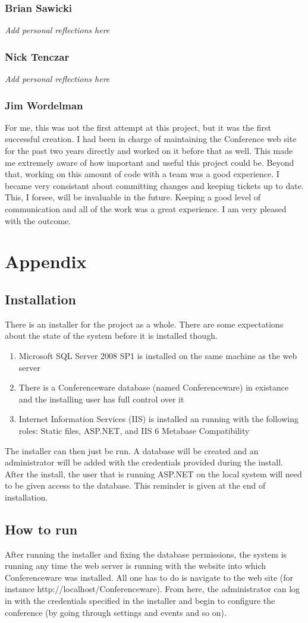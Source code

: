 \documentclass[12pt]{article}
\begin{document}
\subsubsection{Brian Sawicki}
\textit{Add personal reflections here}
\subsubsection{Nick Tenczar}
\textit{Add personal reflections here}
\subsubsection{Jim Wordelman}
For me, this was not the first attempt at this project, but it was the first
successful creation. I had been in charge of maintaining the Conference web site
for the past two years directly and worked on it before that as well. This made
me extremely aware of how important and useful this project could be. Beyond
that, working on this amount of code with a team was a good experience. I became
very consistant about committing changes and keeping tickets up to date. This, I
forsee, will be invaluable in the future. Keeping a good level of communication
and all of the work was a great experience. I am very pleased with the outcome.
\newpage
\section{Appendix}
\subsection{Installation}
There is an installer for the project as a whole. There are some expectations
about the state of the system before it is installed though.
\begin{enumerate}
\item Microsoft SQL Server 2008 SP1 is installed on the same machine as the web
server
\item There is a Conferenceware database (named Conferenceware) in existance and
the installing user has full control over it
\item Internet Information Services (IIS) is installed an running with the
following roles: Static files, ASP.NET, and IIS 6 Metabase Compatibility
\end{enumerate}

The installer can then just be run. A database will be created and an
administrator will be added with the credentials provided during the install.
After the install, the user that is running ASP.NET on the local system will
need to be given access to the database. This reminder is given at the end of
installation.
\subsection{How to run}
After running the installer and fixing the database permissions, the system is
running any time the web server is running with the website into which
Conferenceware was installed. All one has to do is navigate to the web site (for
instance http://localhost/Conferenceware). From here, the administrator can log
in with the credentials specified in the installer and begin to configure the
conference (by going through settings and events and so on).
\end{document}
